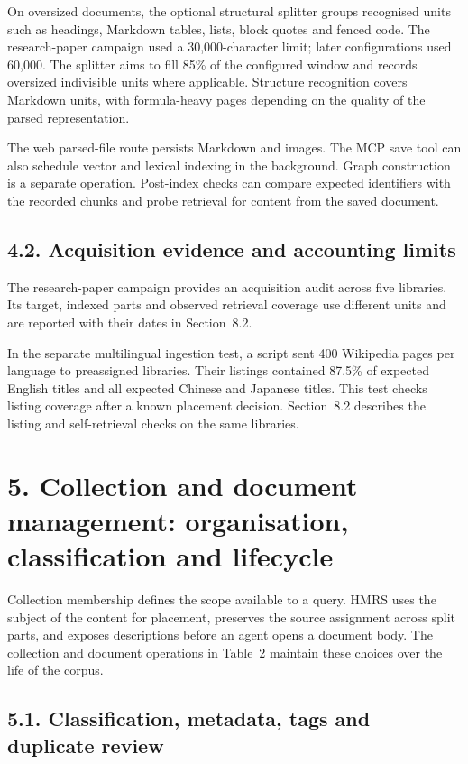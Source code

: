 On oversized documents, the optional structural splitter groups recognised
units such as headings, Markdown tables, lists, block quotes and fenced code.
The research-paper campaign used a 30,000-character limit; later configurations used
60,000. The splitter aims to fill 85\% of the configured window and records
oversized indivisible units where applicable. Structure recognition covers
Markdown units, with formula-heavy pages depending on the quality of the
parsed representation.

The web parsed-file route persists Markdown and images. The MCP save tool
can also schedule vector and lexical indexing in the background. Graph
construction is a separate operation. Post-index checks can compare
expected identifiers with the recorded chunks and probe retrieval for
content from the saved document.

\subsection{4.2. Acquisition evidence and accounting limits}

The research-paper campaign provides an acquisition audit across five
libraries. Its target, indexed parts and observed retrieval coverage use
different units and are reported with their dates in Section~8.2.

In the separate multilingual ingestion test, a script sent 400 Wikipedia
pages per language to preassigned libraries. Their listings contained
87.5\% of expected English titles and all expected Chinese and Japanese
titles. This test checks listing coverage after a known placement decision.
Section~8.2 describes the listing and self-retrieval checks on the
same libraries.


\section{5. Collection and document management: organisation, classification and
lifecycle}


Collection membership defines the scope available to a query. HMRS uses
the subject of the content for placement, preserves the source assignment
across split parts, and exposes descriptions before an agent opens a
document body. The collection and document operations in
Table~2 maintain these choices over the life of the corpus.

\subsection{5.1. Classification, metadata, tags and duplicate review}





